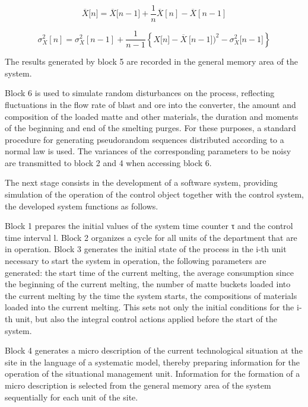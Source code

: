 \begin{equation}
\overline{X}\lbrack n\rbrack = \overline{X}\lbrack n - 1\rbrack + \frac{1}{n} \overline{X}[n]-\overline{X}[n-1]
\end{equation}

\begin{equation}
\sigma_{X}^{2}[n]=\sigma_{X}^{2}[n-1]+\frac{1}{n - 1}\left\{ X\lbrack n\rbrack -\overline{X}\ \lbrack n - 1\rbrack)^{2} - \sigma_{X}^{2}\lbrack n - 1\rbrack \right\}
\end{equation}

\begin{multicols}{2}
The results generated by block 5 are recorded in the general memory area
of the system.

Block 6 is used to simulate random disturbances on the process,
reflecting fluctuations in the flow rate of blast and ore into the
converter, the amount and composition of the loaded matte and other
materials, the duration and moments of the beginning and end of the
smelting purges. For these purposes, a standard procedure for generating
pseudorandom sequences distributed according to a normal law is used.
The variances of the corresponding parameters to be noisy are
transmitted to block 2 and 4 when accessing block 6.

The next stage consists in the development of a software system,
providing simulation of the operation of the control object together
with the control system, the developed system functions as follows.

Block 1 prepares the initial values of the system time counter τ and the
control time interval l. Block 2 organizes a cycle for all units of the
department that are in operation. Block 3 generates the initial state of
the process in the i-th unit necessary to start the system in operation,
the following parameters are generated: the start time of the current
melting, the average consumption since the beginning of the current
melting, the number of matte buckets loaded into the current melting by
the time the system starts, the compositions of materials loaded into
the current melting. This sets not only the initial conditions for the
i-th unit, but also the integral control actions applied before the
start of the system.

Block 4 generates a micro description of the current technological
situation at the site in the language of a systematic model, thereby
preparing information for the operation of the situational management
unit. Information for the formation of a micro description is selected
from the general memory area of the system sequentially for each unit of
the site.


\end{multicols}
